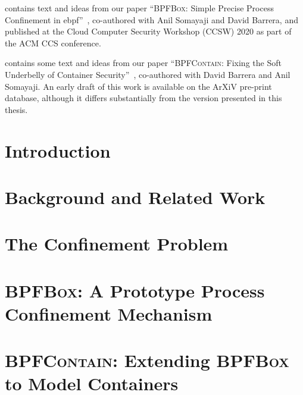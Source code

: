 \documentclass[
  fontsize=12pt,
  titlepage=firstiscover,
  paper=letter,
  oneside,
  cleardoublepage=plain,
  parskip=half-,
  DIV=10,
  parindent,
  appendixprefix,
  chapterprefix,
  listof=totoc,
]{scrbook}
\newcommand{\bpfbox}{\textsc{BPFBox}}
\newcommand{\bpfcontain}{\textsc{BPFContain}}
\begin{document}
 contains text and ideas from our paper \enquote{\bpfbox{}: Simple Precise
Process Confinement in \gls{ebpf}}~\cite{findlay2020_bpfbox}, co-authored with Anil
Somayaji and David Barrera, and published at the Cloud Computer Security Workshop (CCSW)
2020 as part of the ACM CCS conference.

 contains some text and ideas from our paper \enquote{\bpfcontain{}:
Fixing the Soft Underbelly of Container Security}~\cite{findlay2021_bpfcontain},
co-authored with David Barrera and Anil Somayaji. An early draft of this work is available
on the ArXiV pre-print database, although it differs substantially from the version
presented in this thesis.
\endgroup
\cleardoublepage%

\begingroup
\hypersetup{linkcolor=black}
\tableofcontents
\begin{singlespace}
\listoffigures
\listoftables
\lstlistoflistings
\end{singlespace}
\endgroup

\mainmatter%


\chapter{Introduction}%
\label{c:introduction}


\chapter{Background and Related Work}%
\label{c:background}


\chapter{The Confinement Problem}%
\label{c:confinement-problem}


\chapter{\bpfbox: A Prototype Process Confinement Mechanism}%
\label{c:bpfbox}


\chapter{\bpfcontain: Extending \bpfbox{} to Model Containers}%
\label{c:bpfcontain}

\end{document}
